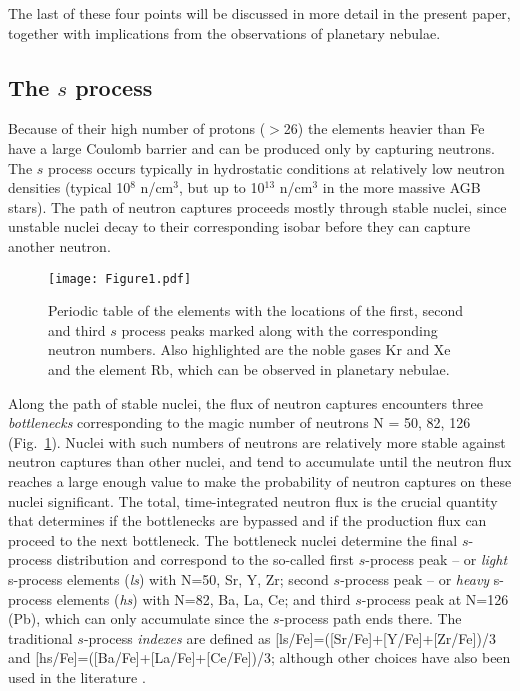 \documentclass{iau}
\begin{document}
The last of these four points will be discussed in more detail in the present 
paper, together with implications from the observations of planetary nebulae.

\subsection{The $s$ process}

Because of their high number of protons ($>$26) the elements heavier than Fe have a 
large Coulomb barrier and can be produced only by capturing neutrons. The $s$ process 
occurs typically in hydrostatic conditions at relatively low neutron densities 
(typical 10$^{8}$ n/cm$^{3}$, but up to 10$^{13}$ n/cm$^{3}$ in the more massive AGB 
stars). The path of neutron captures proceeds mostly through stable nuclei, since 
unstable nuclei decay to their corresponding isobar before they can capture another 
neutron.

\begin{figure}[h]
\begin{center}
 \texttt{[image: Figure1.pdf]} 
 \caption{
Periodic table of the elements with the locations of the first, second and third 
$s$ process peaks marked along with the corresponding neutron numbers.
Also highlighted are the noble gases Kr and Xe and the element Rb, which can be 
observed in planetary nebulae.}
   \label{fig1}
\end{center}
\end{figure}

Along the path of stable nuclei, the flux of neutron captures encounters three {\em 
bottlenecks} corresponding to the magic number of neutrons N = 50, 82, 126 
(Fig.~\ref{fig1}). Nuclei with such numbers of neutrons are relatively more stable against neutron 
captures than other nuclei, and tend to accumulate until the neutron flux  
reaches a large enough value to make the probability of neutron captures on
these nuclei significant. The total, time-integrated neutron flux is the crucial 
quantity that determines if the bottlenecks are bypassed and if the production flux can 
proceed to the next bottleneck. The bottleneck nuclei determine the final $s$-process 
distribution and correspond to the so-called first $s$-process peak -- or {\em light} 
s-process elements ({\em ls}) with N=50, Sr, Y, Zr; second $s$-process peak -- or 
{\em heavy} s-process elements ({\em hs}) with N=82, Ba, La, Ce; and third 
$s$-process peak at N=126 (Pb), which can only accumulate since the $s$-process path 
ends there. The traditional $s$-process {\em indexes} are defined as 
[ls/Fe]=([Sr/Fe]+[Y/Fe]+[Zr/Fe])/3 and [hs/Fe]=([Ba/Fe]+[La/Fe]+[Ce/Fe])/3; although
other choices have also been used in the literature \citep[see discussion in][]{lugaro12}.
\end{document}
